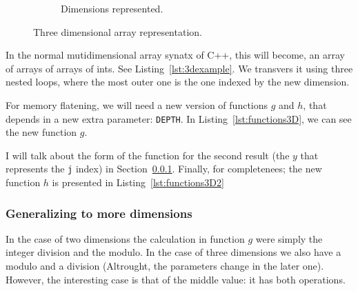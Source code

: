 \begin{figure}[htp]
\begin{subfigure}[b]{0.2\textwidth}
    \caption{Dimensions represented.}
    \label{fig:3b}
  \end{subfigure}
  \caption{Three dimensional array representation.}
  \label{fig:3D}
\end{figure}

In the normal mutidimensional array synatx of C++, this will become, an array of arrays of arrays of ints.
See Listing~\ref{lst:3dexample}.
We transvers it using three nested loops, where the most outer one is the one indexed by the new dimension.


For memory flatening, we will need a new version of functions $g$ and $h$, that depends in a new extra parameter: \texttt{DEPTH}.
In Listing~\ref{lst:functions3D}, we can see the new function $g$.


I will talk about the form of the function for the second result (the $y$ that represents the \texttt{j} index) in Section~\ref{sec:moreDim}.
Finally, for completenees; the new function $h$ is presented in Listing~\ref{lst:functions3D2}


\subsubsection{Generalizing to more dimensions}
\label{sec:moreDim}

In the case of two dimensions the calculation in function $g$ were simply the integer division and the modulo.
In the case of three dimensions we also have a modulo and a division (Altrought, the parameters change in the later one).
However, the interesting case is that of the middle value: it has both operations.

